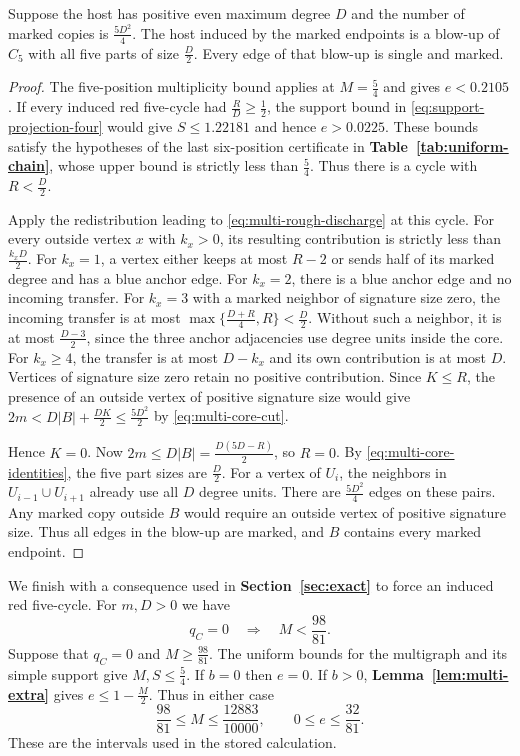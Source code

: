 \begin{lemma}\label{lem:multi-even-equality}
Suppose the host has positive even maximum degree $D$ and the
number of marked copies is $\frac{5D^2}{4}$. The host induced by
the marked endpoints is a blow-up of $C_5$ with all five parts of
size $\frac{D}{2}$. Every edge of that blow-up is single and marked.
\end{lemma}

\begin{proof}
The five-position multiplicity bound applies at $M=\frac{5}{4}$ and
gives $e<0.2105$. If every induced red five-cycle had
$\frac{R}{D}\ge\frac{1}{2}$, the support bound in \eqref{eq:support-projection-four} would give $S\le1.22181$ and
hence $e>0.0225$. These bounds satisfy the hypotheses of the last six-position certificate in \textbf{Table~\ref{tab:uniform-chain}}, whose upper bound is strictly less than
$\frac{5}{4}$. Thus there is a cycle with $R<\frac{D}{2}$.

Apply the redistribution leading to \eqref{eq:multi-rough-discharge}
at this cycle. For every outside vertex $x$ with $k_x>0$, its
resulting contribution is strictly less than $\frac{k_xD}{2}$.
For $k_x=1$, a vertex either keeps at most $R-2$ or sends half of
its marked degree and has a blue anchor edge. For $k_x=2$, there
is a blue anchor edge and no incoming transfer. For $k_x=3$ with
a marked neighbor of signature size zero, the incoming transfer
is at most $\max\{\frac{D+R}{4},R\}<\frac{D}{2}$. Without such a
neighbor, it is at most $\frac{D-3}{2}$, since the three anchor
adjacencies use degree units inside the core. For $k_x\ge4$,
the transfer is at most $D-k_x$ and its own contribution is
at most $D$. Vertices of signature size zero retain no positive
contribution. Since $K\le R$, the presence of an outside vertex
of positive signature size would give $2m<D|B|+\frac{DK}{2}
\le\frac{5D^2}{2}$ by \eqref{eq:multi-core-cut}.

Hence $K=0$. Now $2m\le D|B|=\frac{D(5D-R)}{2}$, so $R=0$.
By \eqref{eq:multi-core-identities}, the five part sizes are
$\frac{D}{2}$. For a vertex of $U_i$, the neighbors in
$U_{i-1}\cup U_{i+1}$ already use all $D$ degree units. There are
$\frac{5D^2}{4}$ edges on these pairs. Any marked copy outside
$B$ would require an outside vertex of positive signature size.
Thus all edges in the blow-up are marked, and $B$ contains every
marked endpoint.
\end{proof}


We finish with a consequence used in \textbf{Section~\ref{sec:exact}}
to force an induced red five-cycle. For $m,D>0$ we have
\begin{equation}\label{eq:absence-red-cycle}
 q_C=0 \quad\Longrightarrow\quad M<\frac{98}{81}.
\end{equation}
Suppose that $q_C=0$ and $M\geq\frac{98}{81}$. The uniform bounds for
the multigraph and its simple support give $M,S\leq\frac54$.
If $b=0$ then $e=0$. If $b>0$, \textbf{Lemma~\ref{lem:multi-extra}}
gives $e\leq1-\frac{M}{2}$. Thus in either case
\[
 \frac{98}{81}\leq M\leq\frac{12883}{10000},
 \qquad 0\leq e\leq\frac{32}{81}.
\]
These are the intervals used in the stored calculation.

